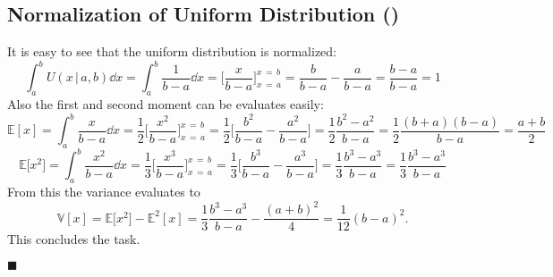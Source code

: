 \documentclass[11pt, a4paper]{scrartcl}
\newcommand{\E}{\mathbb{E}}
\newcommand{\Var}{\mathbb{V}}
\newcommand{\given}{\,\vert\,}
\newcommand{\eot}{\hfill\(\blacksquare\)}
\newcommand{\diffstar}{\texorpdfstring{\raisebox{-1pt}{\resizebox{!}{8pt}{\(\star\)}}}{*}}
\newcommand{\onestar}  {(\diffstar)}
\begin{document}
		\subsection{Normalization of Uniform Distribution  \onestar}
			It is easy to see that the uniform distribution is normalized:
			\begin{equation}
				\int_{a}^{b}\! U(x \given a, b) \dd{x}
					= \int_{a}^{b}\! \frac{1}{b - a} \dd{x}
					= \bigg[ \frac{x}{b - a} \bigg]_{x \,=\, a}^{x \,=\, b}
					= \frac{b}{b - a} - \frac{a}{b - a}
					= \frac{b - a}{b - a}
					= 1
			\end{equation}
			Also the first and second moment can be evaluates easily:
			\begin{equation}
				\E[x]
					= \int_{a}^{b}\! \frac{x}{b - a} \dd{x}
					= \frac{1}{2} \bigg[ \frac{x^2}{b - a} \bigg]_{x \,=\, a}^{x \,=\, b}
					= \frac{1}{2} \bigg[ \frac{b^2}{b - a} - \frac{a^2}{b - a} \bigg]
					= \frac{1}{2} \frac{b^2 - a^2}{b - a}
					= \frac{1}{2} \frac{(b + a) (b - a)}{b - a}
					= \frac{a + b}{2}
			\end{equation}
			\begin{equation}
				\E\big[x^2\big]
					= \int_{a}^{b}\! \frac{x^2}{b - a} \dd{x}
					= \frac{1}{3} \bigg[ \frac{x^3}{b - a} \bigg]_{x \,=\, a}^{x \,=\, b}
					= \frac{1}{3} \bigg[ \frac{b^3}{b - a} - \frac{a^3}{b - a} \bigg]
					= \frac{1}{3} \frac{b^3 - a^3}{b - a}
					= \frac{1}{3} \frac{b^3 - a^3}{b - a}
			\end{equation}
			From this the variance evaluates to
			\begin{equation}
				\Var[x]
					= \E\big[x^2\big] - \E^2[x]
					= \frac{1}{3} \frac{b^3 - a^3}{b - a} - \frac{(a + b)^2}{4}
					= \frac{1}{12} (b - a)^2.
			\end{equation}
			This concludes the task.

			\eot
\end{document}
